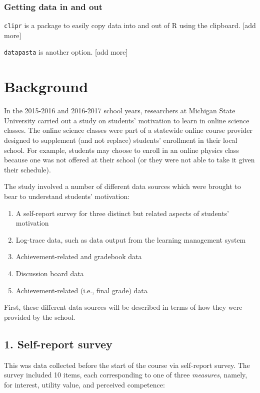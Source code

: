 \documentclass[]{book}
\providecommand{\tightlist}{%
  \setlength{\itemsep}{0pt}\setlength{\parskip}{0pt}}
\begin{document}
\subsection{Getting data in and out}\label{getting-data-in-and-out}

\texttt{clipr} is a package to easily copy data into and out of R using
the clipboard. {[}add more{]}

\texttt{datapasta} is another option. {[}add more{]}

\chapter{Background}\label{background}

In the 2015-2016 and 2016-2017 school years, researchers at Michigan
State University carried out a study on students' motivation to learn in
online science classes. The online science classes were part of a
statewide online course provider designed to supplement (and not
replace) students' enrollment in their local school. For example,
students may choose to enroll in an online physics class because one was
not offered at their school (or they were not able to take it given
their schedule).

The study involved a number of different data sources which were brought
to bear to understand students' motivation:

\begin{enumerate}
\def\labelenumi{\arabic{enumi}.}
\tightlist
\item
  A self-report survey for three distinct but related aspects of
  students' motivation
\item
  Log-trace data, such as data output from the learning management
  system
\item
  Achievement-related and gradebook data
\item
  Discussion board data
\item
  Achievement-related (i.e., final grade) data
\end{enumerate}

First, these different data sources will be described in terms of how
they were provided by the school.

\section{1. Self-report survey}\label{self-report-survey}

This was data collected before the start of the course via self-report
survey. The survey included 10 items, each corresponding to one of three
\emph{measures}, namely, for interest, utility value, and perceived
competence:
\end{document}
